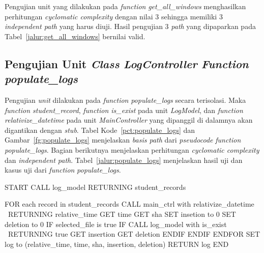 Pengujian unit yang dilakukan pada \emph{function} \emph{get\_all\_windows}
menghasilkan perhitungan \emph{cyclomatic complexity} dengan nilai 3 sehingga
memiliki 3 \emph{independent path} yang harus diuji. Hasil pengujian 3
\emph{path} yang dipaparkan pada Tabel~\ref{jalur:get_all_windows} bernilai valid.

\subsection{Pengujian Unit \emph{Class} \emph{LogController}
  \emph{Function} \emph{populate\_logs}}

Pengujian \emph{unit} dilakukan pada \emph{function}
\emph{populate\_logs} secara terisolasi. Maka \emph{function
  student\_record}, \emph{function is\_exist} pada unit \emph{LogModel},
dan \emph{function relativize\_datetime} pada unit
\emph{MainController} yang dipanggil di dalamnya akan digantikan
dengan \emph{stub}. Tabel Kode~\ref{pct:populate_logs} dan
Gambar~\ref{fg:populate_logs} menjelaskan \emph{basis path} dari
\emph{pseudocode} \emph{function} \emph{populate\_logs}. Bagian
berikutnya menjelaskan perhitungan \emph{cyclomatic complexity} dan
\emph{independent path}. Tabel~\ref{jalur:populate_logs} menjelaskan
hasil uji dan kasus uji dari \emph{function} \emph{populate\_logs}.

\par\null\par
\begin{code}
\begin{ignasicblock}[title=populate\_logs,minted language=text,
underlay={
  \drawline{10cm}{12cm}{2.5}{1}
  \drawline{9cm}{12.5cm}{5}{2}
  \drawbrace{12cm}{5.5}{12.5}{3}
  \drawline{10cm}{12.5cm}{13.5}{4}
  \drawline{10.5cm}{12cm}{16}{5}
  \drawbrace{12cm}{16.5}{18.7}{6}
  \drawline{6.5cm}{12.8cm}{19.6}{7}
  \drawline{6.5cm}{12cm}{21}{8}
  \drawline{6.5cm}{12.8cm}{22}{9}
  \drawbrace{12cm}{23}{26}{10}
 }]

START
  CALL log_model RETURNING student_records

  FOR each record in student_records
    CALL main_ctrl with relativize_datetime \
                         RETURNING relative_time
    GET time
    GET sha
    SET insetion to 0
    SET deletion to 0
    IF selected_file is true
      IF CALL log_model with is_exist \
                             RETURNING true
        GET insertion
        GET deletion
      ENDIF
    ENDIF
  ENDFOR
  SET log to (relative_time, time, sha,
                   insertion, deletion)
  RETURN log
END
\end{ignasicblock}
  \label{pct:populate_logs}
\end{code}

